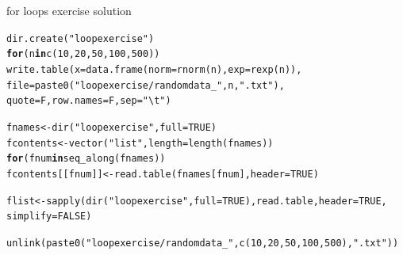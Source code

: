 \documentclass[xcolor=table,      handout ,    xcolor=dvipsnames]{beamer}\usepackage[]{graphicx}\usepackage[]{color}
\makeatletter
\newcommand{\hlnum}[1]{\textcolor[rgb]{0,0,0}{#1}}
\newcommand{\hlstr}[1]{\textcolor[rgb]{0.545,0.137,0.137}{#1}}
\newcommand{\hlstd}[1]{\textcolor[rgb]{0,0,0}{#1}}
\newcommand{\hlkwa}[1]{\textcolor[rgb]{1,0,0}{\textbf{#1}}}
\newcommand{\hlkwb}[1]{\textcolor[rgb]{0,0,0}{#1}}
\newcommand{\hlkwc}[1]{\textcolor[rgb]{1,0,1}{#1}}
\newcommand{\hlkwd}[1]{\textcolor[rgb]{0,0,1}{#1}}
\newenvironment{kframe}{%
 \def\at@end@of@kframe{}%
 \ifinner\ifhmode%
  \def\at@end@of@kframe{\end{minipage}}%
  \begin{minipage}{\columnwidth}%
 \fi\fi%
 \def\FrameCommand##1{\hskip\@totalleftmargin \hskip-\fboxsep
 \colorbox{shadecolor}{##1}\hskip-\fboxsep
     \hskip-\linewidth \hskip-\@totalleftmargin \hskip\columnwidth}%
 \MakeFramed {\advance\hsize-\width
   \@totalleftmargin\z@ \linewidth\hsize
   \@setminipage}}%
 {\par\unskip\endMakeFramed%
 \at@end@of@kframe}
\newenvironment{knitrout}{}{} %
\makeatother
\begin{document}

\begin{frame}[fragile]{for loops exercise solution}
\begin{knitrout}\footnotesize
{}\color{fgcolor}\begin{kframe}
\begin{alltt}
\hlkwd{dir.create}\hlstd{(}\hlstr{"loopexercise"}\hlstd{)}
\hlkwa{for}\hlstd{(n} \hlkwa{in} \hlkwd{c}\hlstd{(}\hlnum{10}\hlstd{,}\hlnum{20}\hlstd{,}\hlnum{50}\hlstd{,}\hlnum{100}\hlstd{,}\hlnum{500}\hlstd{))}
    \hlkwd{write.table}\hlstd{(}\hlkwc{x}\hlstd{=}\hlkwd{data.frame}\hlstd{(}\hlkwc{norm}\hlstd{=}\hlkwd{rnorm}\hlstd{(n),} \hlkwc{exp}\hlstd{=}\hlkwd{rexp}\hlstd{(n)),}
                \hlkwc{file}\hlstd{=}\hlkwd{paste0}\hlstd{(}\hlstr{"loopexercise/randomdata_"}\hlstd{, n,} \hlstr{".txt"}\hlstd{),}
                \hlkwc{quote}\hlstd{=F,} \hlkwc{row.names}\hlstd{=F,} \hlkwc{sep}\hlstd{=}\hlstr{"\textbackslash{}t"}\hlstd{)}

\hlstd{fnames} \hlkwb{<-} \hlkwd{dir}\hlstd{(}\hlstr{"loopexercise"}\hlstd{,} \hlkwc{full}\hlstd{=}\hlnum{TRUE}\hlstd{)}
\hlstd{fcontents} \hlkwb{<-} \hlkwd{vector}\hlstd{(}\hlstr{"list"}\hlstd{,} \hlkwc{length}\hlstd{=}\hlkwd{length}\hlstd{(fnames))}
\hlkwa{for}\hlstd{(fnum} \hlkwa{in} \hlkwd{seq_along}\hlstd{(fnames))}
   \hlstd{fcontents[[fnum]]} \hlkwb{<-} \hlkwd{read.table}\hlstd{(fnames[fnum],} \hlkwc{header}\hlstd{=}\hlnum{TRUE}\hlstd{)}

\hlstd{flist} \hlkwb{<-} \hlkwd{sapply}\hlstd{(}\hlkwd{dir}\hlstd{(}\hlstr{"loopexercise"}\hlstd{,} \hlkwc{full}\hlstd{=}\hlnum{TRUE}\hlstd{), read.table,} \hlkwc{header}\hlstd{=}\hlnum{TRUE}\hlstd{,}
                \hlkwc{simplify}\hlstd{=}\hlnum{FALSE}\hlstd{)}

\hlkwd{unlink}\hlstd{(}\hlkwd{paste0}\hlstd{(}\hlstr{"loopexercise/randomdata_"}\hlstd{,} \hlkwd{c}\hlstd{(}\hlnum{10}\hlstd{,}\hlnum{20}\hlstd{,}\hlnum{50}\hlstd{,}\hlnum{100}\hlstd{,}\hlnum{500}\hlstd{),} \hlstr{".txt"}\hlstd{))}
\end{alltt}
\end{kframe}
\end{knitrout}
\end{frame}

\end{document}
